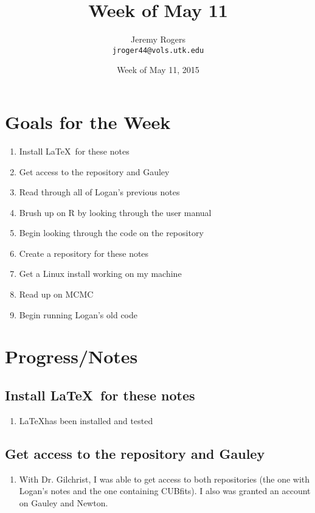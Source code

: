 \documentclass[12 pt]{article}
\title{Week of May 11}
\author{Jeremy Rogers \\
	\texttt{jroger44@vols.utk.edu}}
\date{Week of May 11, 2015}
\begin{document}
	\maketitle
	
	\tableofcontents
	
	\section{Goals for the Week}
	\begin{enumerate}
		\item Install \LaTeX\ for these notes
		\item Get access to the repository and Gauley
		\item Read through all of Logan's previous notes
		\item Brush up on R by looking through the user manual
		\item Begin looking through the code on the repository
		\item Create a repository for these notes
		\item Get a Linux install working on my machine
		\item Read up on MCMC
		\item Begin running Logan's old code
	\end{enumerate}
	
	\section{Progress/Notes}
	
	\subsection{Install \LaTeX\ for these notes}
		\begin{enumerate}
			\item \LaTeX has been installed and tested
		\end{enumerate}
	
	\subsection{Get access to the repository and Gauley}
		 \begin{enumerate}
		 	\item With Dr. Gilchrist, I was able to get access to both repositories (the one with Logan's notes and the one containing CUBfits). I also was granted an account on Gauley and Newton.
		 \end{enumerate}
\end{document}
